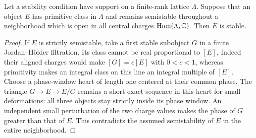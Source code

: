 \begin{lemma}\label{lem:primitive-point}
Let a stability condition have support on a finite-rank lattice $\Lambda$.
Suppose that an object $E$ has primitive class in $\Lambda$ and remains
semistable throughout a neighborhood which is open in all central charges
$\operatorname{Hom}(\Lambda,\mathbb C)$.  Then $E$ is stable.
\end{lemma}

\begin{proof}
If $E$ is strictly semistable, take a first stable subobject $G$ in a finite
Jordan--Hölder filtration.  Its class cannot be real proportional to $[E]$.
Indeed their aligned charges would make $[G]=c[E]$ with $0<c<1$, whereas
primitivity makes an integral class on this line an integral multiple of
$[E]$.  Choose a phase-window heart of length one centered at their common
phase.  The triangle $G\to E\to E/G$ remains a short exact sequence in
this heart for small deformations: all three objects stay strictly inside
its phase window.  An independent small perturbation of the two charge
values makes the phase of $G$ greater than that of $E$.  This contradicts
the assumed semistability of $E$ in the entire neighborhood.
\end{proof}

